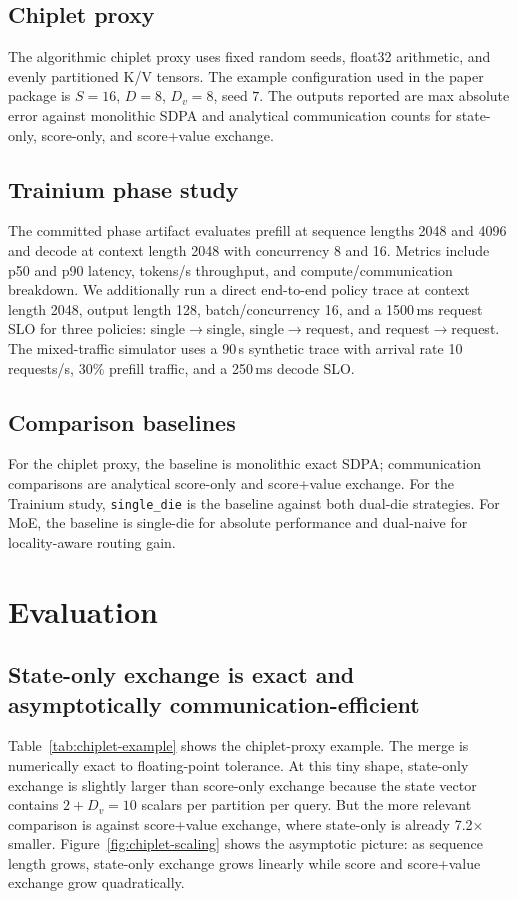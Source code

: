 \documentclass[10pt]{article}
\begin{document}
\subsection{Chiplet proxy}
The algorithmic chiplet proxy uses fixed random seeds, float32 arithmetic, and evenly partitioned K/V tensors. The example configuration used in the paper package is $S=16$, $D=8$, $D_v=8$, seed $7$. The outputs reported are max absolute error against monolithic SDPA and analytical communication counts for state-only, score-only, and score+value exchange.

\subsection{Trainium phase study}
The committed phase artifact evaluates prefill at sequence lengths 2048 and 4096 and decode at context length 2048 with concurrency 8 and 16. Metrics include p50 and p90 latency, tokens/s throughput, and compute/communication breakdown. We additionally run a direct end-to-end policy trace at context length 2048, output length 128, batch/concurrency 16, and a 1500\,ms request SLO for three policies: single$\rightarrow$single, single$\rightarrow$request, and request$\rightarrow$request. The mixed-traffic simulator uses a 90\,s synthetic trace with arrival rate 10 requests/s, 30\% prefill traffic, and a 250\,ms decode SLO.

\subsection{Comparison baselines}
For the chiplet proxy, the baseline is monolithic exact SDPA; communication comparisons are analytical score-only and score+value exchange. For the Trainium study, \texttt{single\_die} is the baseline against both dual-die strategies. For MoE, the baseline is single-die for absolute performance and dual-naive for locality-aware routing gain.

\section{Evaluation}

\subsection{State-only exchange is exact and asymptotically communication-efficient}
Table~\ref{tab:chiplet-example} shows the chiplet-proxy example. The merge is numerically exact to floating-point tolerance. At this tiny shape, state-only exchange is slightly larger than score-only exchange because the state vector contains $2 + D_v = 10$ scalars per partition per query. But the more relevant comparison is against score+value exchange, where state-only is already \num{7.2}$\times$ smaller. Figure~\ref{fig:chiplet-scaling} shows the asymptotic picture: as sequence length grows, state-only exchange grows linearly while score and score+value exchange grow quadratically.
\end{document}
